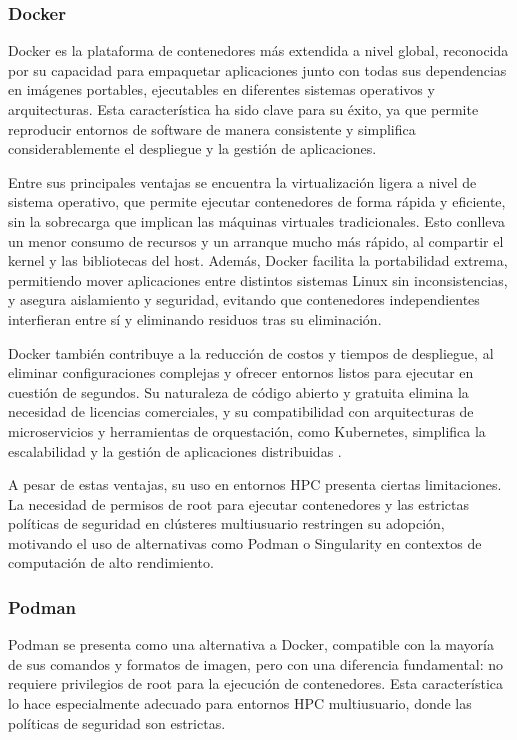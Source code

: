 \subsubsection{Docker}

Docker es la plataforma de contenedores más extendida a nivel global, reconocida por su capacidad para empaquetar aplicaciones junto con todas sus dependencias en imágenes portables, ejecutables en diferentes sistemas operativos y arquitecturas. Esta característica ha sido clave para su éxito, ya que permite reproducir entornos de software de manera consistente y simplifica considerablemente el despliegue y la gestión de aplicaciones.

Entre sus principales ventajas se encuentra la virtualización ligera a nivel de sistema operativo, que permite ejecutar contenedores de forma rápida y eficiente, sin la sobrecarga que implican las máquinas virtuales tradicionales. Esto conlleva un menor consumo de recursos y un arranque mucho más rápido, al compartir el kernel y las bibliotecas del host. Además, Docker facilita la portabilidad extrema, permitiendo mover aplicaciones entre distintos sistemas Linux sin inconsistencias, y asegura aislamiento y seguridad, evitando que contenedores independientes interfieran entre sí y eliminando residuos tras su eliminación.

Docker también contribuye a la reducción de costos y tiempos de despliegue, al eliminar configuraciones complejas y ofrecer entornos listos para ejecutar en cuestión de segundos. Su naturaleza de código abierto y gratuita elimina la necesidad de licencias comerciales, y su compatibilidad con arquitecturas de microservicios y herramientas de orquestación, como Kubernetes, simplifica la escalabilidad y la gestión de aplicaciones distribuidas \cite{Bhatia2017THERT}.

A pesar de estas ventajas, su uso en entornos HPC presenta ciertas limitaciones. La necesidad de permisos de root para ejecutar contenedores y las estrictas políticas de seguridad en clústeres multiusuario restringen su adopción, motivando el uso de alternativas como Podman o Singularity en contextos de computación de alto rendimiento.

\subsubsection{Podman}

Podman se presenta como una alternativa a Docker, compatible con la mayoría de sus comandos y formatos de imagen, pero con una diferencia fundamental: no requiere privilegios de root para la ejecución de contenedores. Esta característica lo hace especialmente adecuado para entornos HPC multiusuario, donde las políticas de seguridad son estrictas.

